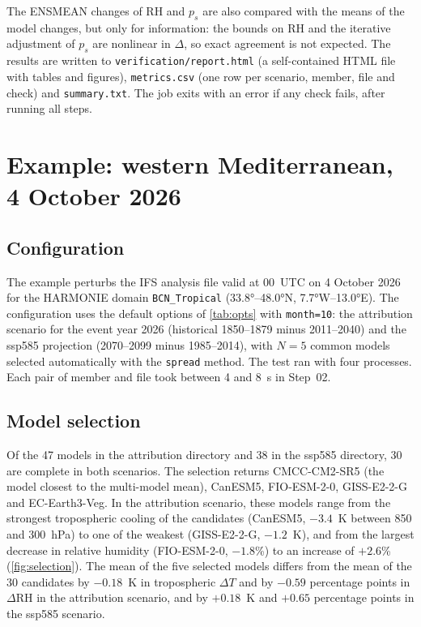 \documentclass[11pt,a4paper]{article}
\newcommand{\code}[1]{\texttt{#1}}
\newcommand{\dT}{\Delta T}
\newcommand{\dRH}{\Delta \mathrm{RH}}
\begin{document}
The ENSMEAN changes of RH and $p_s$ are also compared with the means of the
model changes, but only for information: the bounds on RH and the iterative
adjustment of $p_s$ are nonlinear in $\Delta$, so exact agreement is not
expected. The results are written to \code{verification/report.html} (a
self-contained HTML file with tables and figures), \code{metrics.csv} (one
row per scenario, member, file and check) and \code{summary.txt}. The job
exits with an error if any check fails, after running all steps.

\section{Example: western Mediterranean, 4 October 2026}
\label{sec:example}

\subsection{Configuration}

The example perturbs the IFS analysis file valid at 00~UTC on 4 October 2026
for the HARMONIE domain \code{BCN\_Tropical} (\ang{33.8}--\ang{48.0}N,
\ang{7.7}W--\ang{13.0}E). The configuration uses the default options of
\cref{tab:opts} with \code{month=10}: the attribution scenario for the event
year 2026 (historical 1850--1879 minus 2011--2040) and the ssp585 projection
(2070--2099 minus 1985--2014), with $N = 5$ common models selected
automatically with the \code{spread} method. The test ran with four
processes. Each pair of member and file took between 4 and \SI{8}{s} in
Step~02.

\subsection{Model selection}

Of the 47 models in the attribution directory and 38 in the ssp585 directory,
30 are complete in both scenarios. The selection returns CMCC-CM2-SR5 (the
model closest to the multi-model mean), CanESM5, FIO-ESM-2-0, GISS-E2-2-G and
EC-Earth3-Veg. In the attribution scenario, these models range from the
strongest tropospheric cooling of the candidates (CanESM5, $-3.4$~K between
850 and \SI{300}{hPa}) to one of the weakest (GISS-E2-2-G, $-1.2$~K), and
from the largest decrease in relative humidity (FIO-ESM-2-0, $-1.8$\%) to an
increase of $+2.6$\% (\cref{fig:selection}). The mean of the five selected
models differs from the mean of the 30 candidates by $-0.18$~K in
tropospheric $\dT$ and by $-0.59$ percentage points in $\dRH$ in the
attribution scenario, and by $+0.18$~K and $+0.65$ percentage points in the
ssp585 scenario.
\end{document}

